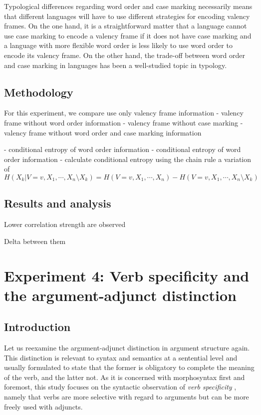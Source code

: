 Typological differences regarding word order and case marking necessarily means that different languages will have to use different strategies for encoding valency frames. On the one hand, it is a straightforward matter that a language cannot use case marking to encode a valency frame if it does not have case marking and a language with more flexible word order is less likely to use word order to encode its valency frame. On the other hand, the trade-off between word order and case marking in languages has been a well-studied topic in typology.

\subsection{Methodology}

For this experiment, we compare use only valency frame information  
- valency frame without word order information
- valency frame without case marking
- valency frame without word order and case marking information

- conditional entropy of word order information 
-  conditional entropy of word order information 
- calculate conditional entropy using the chain rule
a variation of
$$H(X_{k} | V = v, X_{1},\cdots,X_{n} \setminus X_{k}) = H( V = v, X_{1},\cdots,X_{n}) - H( V = v, X_{1},\cdots,X_{n}\setminus X_{k})$$

\subsection{Results and analysis}


Lower correlation strength are observed


Delta between them 

\section{Experiment 4: Verb specificity and the argument-adjunct distinction}\label{sec:exp4-verb-specificity}

\subsection{Introduction}

Let us reexamine the argument-adjunct distinction in argument structure again. This distinction is relevant to syntax and semantics at a sentential level and usually formulated to state that the former is obligatory to complete the meaning of the verb, and the latter not. As it is concerned with morphosyntax first and foremost, this study focuses on the syntactic observation of \textit{verb specificity} \citep[cf.]{haspelmath2015a}, namely that verbs are more selective with regard to arguments but can be more freely used with adjuncts. 

